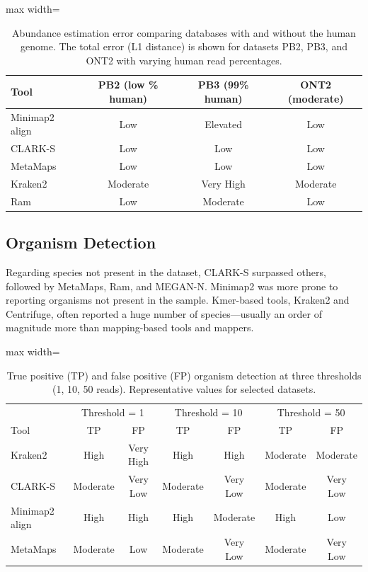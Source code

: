 \documentclass{article}
\begin{document}
\begin{table}[htbp]
\centering
\caption{Abundance estimation error comparing databases with and without the human genome. The total error (L1 distance) is shown for datasets PB2, PB3, and ONT2 with varying human read percentages.}
\label{tab:host}
\begin{adjustbox}{max width=\textwidth}
\begin{tabular}{lccc}
\toprule
Tool & PB2 (low \% human) & PB3 (99\% human) & ONT2 (moderate) \\
\midrule
Minimap2 align & Low & Elevated & Low \\
CLARK-S & Low & Low & Low \\
MetaMaps & Low & Low & Low \\
Kraken2 & Moderate & Very High & Moderate \\
Ram & Low & Moderate & Low \\
\bottomrule
\end{tabular}
\end{adjustbox}
\end{table}

\subsection{Organism Detection}

Regarding species not present in the dataset, CLARK-S surpassed others, followed by MetaMaps, Ram, and MEGAN-N. Minimap2 was more prone to reporting organisms not present in the sample. Kmer-based tools, Kraken2 and Centrifuge, often reported a huge number of species---usually an order of magnitude more than mapping-based tools and mappers.

\begin{table}[htbp]
\centering
\caption{True positive (TP) and false positive (FP) organism detection at three thresholds (1, 10, 50 reads). Representative values for selected datasets.}
\label{tab:detection}
\begin{adjustbox}{max width=\textwidth}
\begin{tabular}{lcccccc}
\toprule
& \multicolumn{2}{c}{Threshold = 1} & \multicolumn{2}{c}{Threshold = 10} & \multicolumn{2}{c}{Threshold = 50} \\
Tool & TP & FP & TP & FP & TP & FP \\
\midrule
Kraken2 & High & Very High & High & High & Moderate & Moderate \\
CLARK-S & Moderate & Very Low & Moderate & Very Low & Moderate & Very Low \\
Minimap2 align & High & High & High & Moderate & High & Low \\
MetaMaps & Moderate & Low & Moderate & Very Low & Moderate & Very Low \\
\bottomrule
\end{tabular}
\end{adjustbox}
\end{table}
\end{document}
